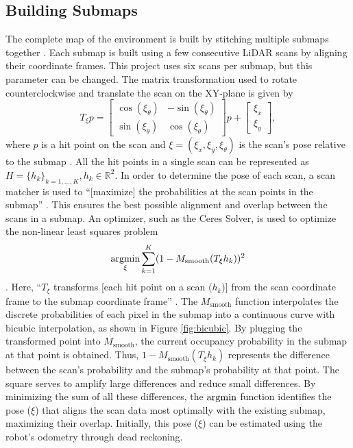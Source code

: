 \subsection{Building Submaps} \label{submaps}
The complete map of the environment is built by stitching multiple submaps together \parencite{hessRealtimeLoopClosure2016}. Each submap is built using a few consecutive LiDAR scans by aligning their coordinate frames. This project uses six scans per submap, but this parameter can be changed. The matrix transformation used to rotate counterclockwise and translate the scan on the XY-plane is given by
\[
    T_\xi p =
    \begin{bmatrix}
        \cos(\xi_\theta) & -\sin(\xi_\theta) \\
        \sin(\xi_\theta) & \cos(\xi_\theta)
    \end{bmatrix}p + \begin{bmatrix}
        \xi_x \\
        \xi_y
    \end{bmatrix},
\]
where $p$ is a hit point on the scan and $\xi=(\xi_x,\xi_y,\xi_\theta)$ is the scan's pose relative to the submap \parencite{RotationMatrix2024,hessRealtimeLoopClosure2016}. All the hit points in a single scan can be represented as $H=\{h_k\}_{k=1,\ldots,K},h_k\in\mathbb{R}^2$. In order to determine the pose of each scan, a scan matcher is used to ``[maximize] the probabilities at the scan points in the submap'' \parencite{hessRealtimeLoopClosure2016}. This ensures the best possible alignment and overlap between the scans in a submap. An optimizer, such as the Ceres Solver, is used to optimize the non-linear least squares problem
\[
    \operatorname*{argmin}_{\xi} \sum_{k=1}^{K}(1 - M_\text{smooth}(T_\xi h_k))^2
\]
\parencite{SolvingNonlinearLeast,hessRealtimeLoopClosure2016}. Here, ``$T_\xi$ transforms [each hit point on a scan ($h_k$)] from the scan coordinate frame to the submap coordinate frame'' \parencite{hessRealtimeLoopClosure2016}. The $M_\text{smooth}$ function interpolates the discrete probabilities of each pixel in the submap into a continuous curve with bicubic interpolation, as shown in Figure \ref{fig:bicubic}. By plugging the transformed point into $M_\text{smooth}$, the current occupancy probability in the submap at that point is obtained. Thus, $1 - M_\text{smooth}(T_\xi h_k)$ represents the difference between the scan's probability and the submap's probability at that point. The square serves to amplify large differences and reduce small differences. By minimizing the sum of all these differences, the $\operatorname*{argmin}$ function identifies the pose ($\xi$) that aligns the scan data most optimally with the existing submap, maximizing their overlap. Initially, this pose ($\xi$) can be estimated using the robot's odometry through dead reckoning.


